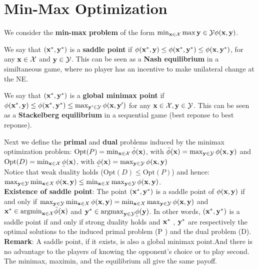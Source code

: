 \section{Min-Max Optimization}
We consider the \textbf{min-max problem} of the form $\min_{\mathbf{x} \in \mathcal{X}} \max{\mathbf{y}\in \mathcal{Y}} \phi(\mathbf{x}, \mathbf{y})$.
\begin{framed}
    We say that $(\mathbf{x}^*, \mathbf{y}^*)$ is a \textbf{saddle point} if $\phi(\mathbf{x}^*, \mathbf{y}) \leq \phi(\mathbf{x}^*, \mathbf{y}^*) \leq \phi(\mathbf{x}, \mathbf{y}^*)$, for any $\mathbf{x} \in \mathcal{X}$ and $\mathbf{y} \in \mathcal{Y}$. This can be seen as a \textbf{Nash equilibrium} in a similtaneous game, where no player has an incentive to make unilateral change at the NE.
\end{framed}
\begin{framed}
    We say that $(\mathbf{x}^*, \mathbf{y}^*)$ is a \textbf{global minimax point} if $\phi(\mathbf{x}^*, \mathbf{y}) \leq \phi(\mathbf{x}^*, \mathbf{y}^*) \leq \max_{\mathbf{y}' \in \mathcal{Y}} \phi(\mathbf{x}, \mathbf{y}')$ for any $\mathbf{x} \in \mathcal{X}, \mathbf{y} \in \mathcal{Y}$. This can be seen as a \textbf{Stackelberg equilibrium} in a sequential game (best reponse to best reponse).
\end{framed}
Next we define the \textbf{primal} and \textbf{dual} problems induced by the minimax optimization problem:
$\mathrm{Opt}(P) = \min_{\mathbf{x} \in \mathcal{X}}{\Bar{\phi}(\mathbf{x})}$, with $\Bar{\phi}(\mathbf{x}) = \max_{\mathbf{y} \in \mathcal{Y}}{\phi(\mathbf{x}, \mathbf{y})}$ and $\mathrm{Opt}(D) = \min_{\xx \in \X}{\ubar{\phi}(\xx)}$, with $\ubar{\phi}(\xx) = \max_{\yy \in \Y}{\phi(\xx, \yy)}$ \\
Notice that weak duality holds ($\mathrm{Opt}(D) \leq \mathrm{Opt}(P)$) and hence: $\max_{\mathbf{y} \in \mathcal{Y}}\min_{\mathbf{x} \in X}{\phi(\mathbf{x}, \mathbf{y})} \leq \min_{\mathbf{x} \in X}\max_{\mathbf{y} \in \mathcal{Y}}{\phi(\mathbf{x}, \mathbf{y})}$. \\
\textbf{Existence of saddle point}: The point $(\mathbf{x}^*, \mathbf{y}^*)$ is a saddle point of $\phi(\mathbf{x}, \mathbf{y})$ if and only if $\max_{\mathbf{y} \in \mathcal{Y}}\min_{\mathbf{x} \in X}{\phi(\mathbf{x}, \mathbf{y})} = \min_{\mathbf{x} \in X}\max_{\mathbf{y} \in \mathcal{Y}}{\phi(\mathbf{x}, \mathbf{y})}$ and $\mathbf{x}^* \in \mathrm{argmin}_{\mathbf{x} \in \mathcal{X}}{\Bar{\phi}(\mathbf{x})}$ and $\yy^* \in \argmax_{\yy \in \Y}{\ubar{\phi}(\yy)}$. In other words, $(\mathbf{x}^*, \mathbf{y}^*)$ is a saddle point if and only if strong duality holds and $\mathbf{x}^*$ , $\mathbf{y}^*$ are respectively the optimal solutions to the induced primal problem (P ) and the dual problem (D). \\
\textbf{Remark}: A saddle point, if it exists, is also a global minimax point.And there is no advantage to the players of knowing the opponent’s choice or to play second. The minimax, maximin, and the equilibrium all give the same payoff. \\
